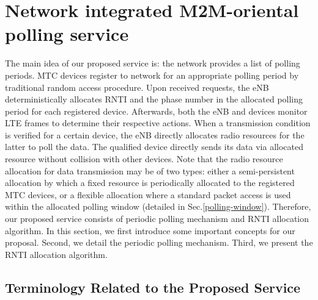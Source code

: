 \section{Network integrated M2M-oriental polling service}
\label{sec:polling}
The main idea of our proposed service is: the network provides a list of polling periods. MTC devices register to network for an appropriate polling period by traditional random access procedure. 
Upon received requests, the eNB deterministically allocates RNTI and the phase number in the allocated polling period for each registered device.
Afterwards, both the eNB and devices monitor LTE frames to determine their respective actions. When a transmission condition is verified for a certain device, the eNB directly allocates radio resources for the latter to poll the data. The qualified device directly sends its data via allocated resource without collision with other devices. Note that the radio resource allocation for data transmission may be of two types: either a semi-persistent allocation by which a fixed resource is periodically allocated to the registered MTC devices, or a flexible allocation where a standard packet access is used within the allocated polling window (detailed in Sec.\ref{polling-window}). 
Therefore, our proposed service consists of periodic polling mechanism and RNTI allocation algorithm. 
In this section, we first introduce some important concepts for our proposal. Second, we detail the periodic polling mechanism. Third, we present the RNTI allocation algorithm. 
\subsection{Terminology Related to the Proposed Service }

